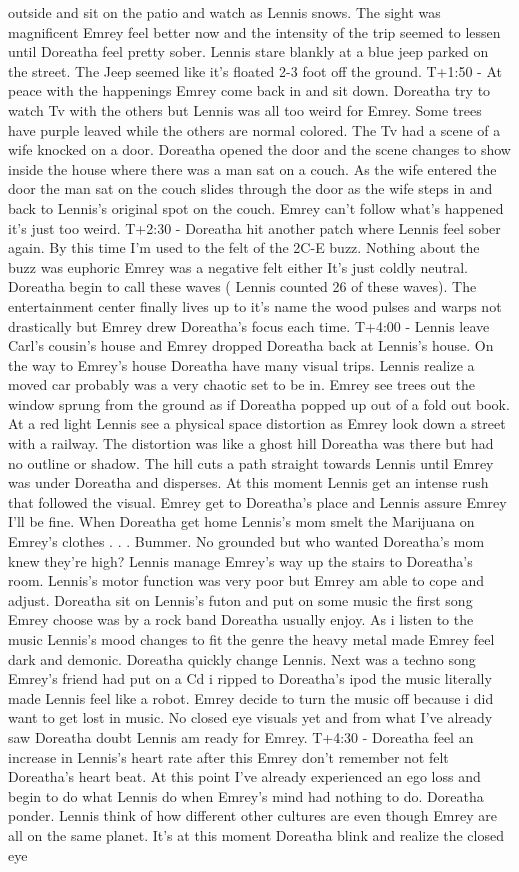\documentclass[12pt]{book}
\begin{document}
outside and sit on the patio and watch as Lennis snows. The sight was magnificent Emrey feel better now and the intensity of the trip seemed to lessen until Doreatha feel pretty sober. Lennis stare blankly at a blue jeep parked on the street. The Jeep seemed like it's floated 2-3 foot off the ground. T+1:50 - At peace with the happenings Emrey come back in and sit down. Doreatha try to watch Tv with the others but Lennis was all too weird for Emrey. Some trees have purple leaved while the others are normal colored. The Tv had a scene of a wife knocked on a door. Doreatha opened the door and the scene changes to show inside the house where there was a man sat on a couch. As the wife entered the door the man sat on the couch slides through the door as the wife steps in and back to Lennis's original spot on the couch. Emrey can't follow what's happened it's just too weird. T+2:30 - Doreatha hit another patch where Lennis feel sober again. By this time I'm used to the felt of the 2C-E buzz. Nothing about the buzz was euphoric Emrey was a negative felt either It's just coldly neutral. Doreatha begin to call these waves ( Lennis counted 26 of these waves). The entertainment center finally lives up to it's name the wood pulses and warps not drastically but Emrey drew Doreatha's focus each time. T+4:00 - Lennis leave Carl's cousin's house and Emrey dropped Doreatha back at Lennis's house. On the way to Emrey's house Doreatha have many visual trips. Lennis realize a moved car probably was a very chaotic set to be in. Emrey see trees out the window sprung from the ground as if Doreatha popped up out of a fold out book. At a red light Lennis see a physical space distortion as Emrey look down a street with a railway. The distortion was like a ghost hill Doreatha was there but had no outline or shadow. The hill cuts a path straight towards Lennis until Emrey was under Doreatha and disperses. At this moment Lennis get an intense rush that followed the visual. Emrey get to Doreatha's place and Lennis assure Emrey I'll be fine. When Doreatha get home Lennis's mom smelt the Marijuana on Emrey's clothes . . .  Bummer. No grounded but who wanted Doreatha's mom knew they're high? Lennis manage Emrey's way up the stairs to Doreatha's room. Lennis's motor function was very poor but Emrey am able to cope and adjust. Doreatha sit on Lennis's futon and put on some music the first song Emrey choose was by a rock band Doreatha usually enjoy. As i listen to the music Lennis's mood changes to fit the genre the heavy metal made Emrey feel dark and demonic. Doreatha quickly change Lennis. Next was a techno song Emrey's friend had put on a Cd i ripped to Doreatha's ipod the music literally made Lennis feel like a robot. Emrey decide to turn the music off because i did want to get lost in music. No closed eye visuals yet and from what I've already saw Doreatha doubt Lennis am ready for Emrey. T+4:30 - Doreatha feel an increase in Lennis's heart rate after this Emrey don't remember not felt Doreatha's heart beat. At this point I've already experienced an ego loss and begin to do what Lennis do when Emrey's mind had nothing to do. Doreatha ponder. Lennis think of how different other cultures are even though Emrey are all on the same planet. It's at this moment Doreatha blink and realize the closed eye 
\end{document}

